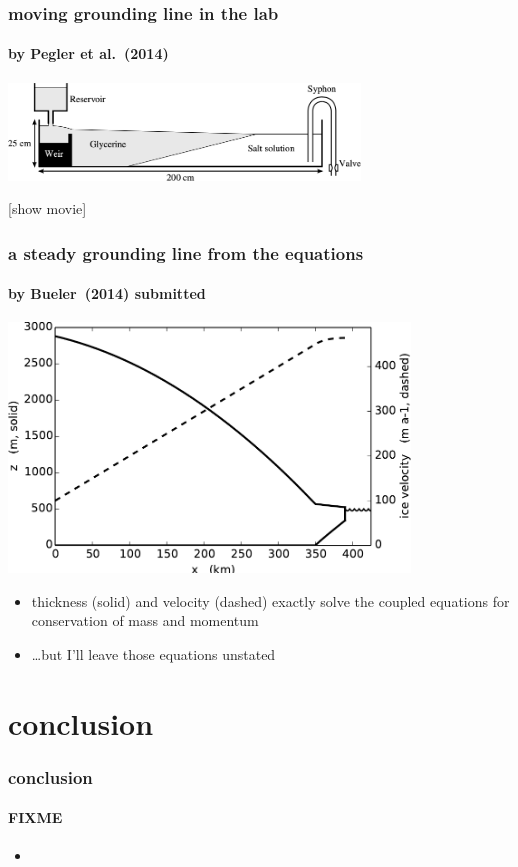 \documentclass{beamer}
\begin{document}
\begin{frame}
  \frametitle{moving grounding line in the lab}
  \framesubtitle{by Pegler et al.~(2014)}

\begin{center}

\includegraphics[width=0.7\textwidth]{pegler2014-grounding-line-schematic}

\vspace{1.0in}
[show movie]
\end{center}
\end{frame}


\begin{frame}
  \frametitle{a steady grounding line from the equations}
  \framesubtitle{by Bueler~(2014) submitted}

\begin{center}
\includegraphics[width=0.8\textwidth]{exactmarine-geometry}
\end{center}

\vspace{-0.2in}

\small
\begin{itemize}
\item thickness (solid) and velocity (dashed) exactly solve the coupled equations for conservation of mass and momentum
\item \dots but I'll leave those equations unstated
\end{itemize}
\normalsize
\end{frame}







\section*{conclusion}

\begin{frame}
  \frametitle{conclusion}
  \framesubtitle{FIXME}

\begin{itemize}
\item 
\end{itemize}
\end{frame}


\end{document}

